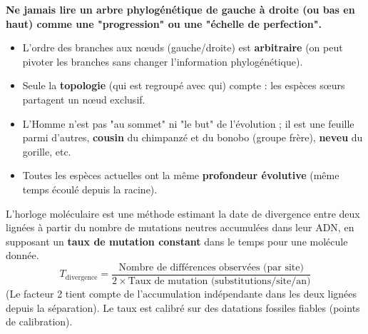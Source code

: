 \documentclass[11pt]{article}
\newcommand{\cle}[1]{{\popxbold\color{popdark}#1}}
\begin{document}
\begin{attention}
\textbf{Ne jamais lire un arbre phylogénétique de gauche à droite (ou bas en haut) comme une "progression" ou une "échelle de perfection".}
\begin{itemize}
    \item L'ordre des branches aux nœuds (gauche/droite) est \textbf{arbitraire} (on peut pivoter les branches sans changer l'information phylogénétique).
    \item Seule la \textbf{topologie} (qui est regroupé avec qui) compte : les espèces sœurs partagent un nœud exclusif.
    \item L'Homme n'est pas "au sommet" ni "le but" de l'évolution ; il est une feuille parmi d'autres, \textbf{cousin} du chimpanzé et du bonobo (groupe frère), \textbf{neveu} du gorille, etc.
    \item Toutes les espèces actuelles ont la même \textbf{profondeur évolutive} (même temps écoulé depuis la racine).
\end{itemize}
\end{attention}

\begin{definition}
L'\cle{horloge moléculaire} est une méthode estimant la date de divergence entre deux lignées à partir du nombre de mutations neutres accumulées dans leur ADN, en supposant un \textbf{taux de mutation constant} dans le temps pour une molécule donnée. 
\[
T_{\text{divergence}} = \frac{\text{Nombre de différences observées (par site)}}{2 \times \text{Taux de mutation (substitutions/site/an)}}
\]
(Le facteur 2 tient compte de l'accumulation indépendante dans les deux lignées depuis la séparation). Le taux est calibré sur des datations fossiles fiables (points de calibration).
\end{definition}
\end{document}
